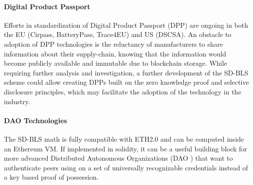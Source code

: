 \paragraph{Digital Product Passport}
Efforts in standardization of Digital Product Passport (DPP) are ongoing in both the EU (Cirpass, BatteryPass, Trace4EU) and US (DSCSA). An obstacle to adoption of DPP technologies is the reluctancy of manufacturers to share information about their supply-chain, knowing that the information would become publicly available and immutable due to blockchain storage. While requiring further analysis and investigation, a further development of the SD-BLS scheme could allow creating DPPs built on the zero knowledge proof and selective disclosure principles, which may facilitate the adoption of the technology in the industry.

\paragraph{DAO Technologies}
The SD-BLS math is fully compatible with ETH2.0 and can be computed inside an Ethereum VM. If implemented in solidity, it can be a useful building block for more advanced Distributed Autonomous Organizations (DAO \cite{dao}) that want to authenticate peers using on a set of universally recognizable credentials instead of a key based proof of possession.






